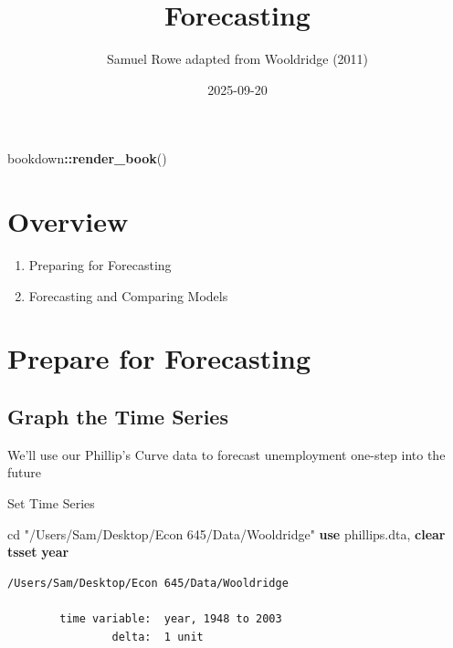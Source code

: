 \documentclass[
]{book}
\title{Forecasting}
\author{Samuel Rowe adapted from Wooldridge (2011)}
\date{2025-09-20}
\newenvironment{Shaded}{\begin{snugshade}}{\end{snugshade}}
\newcommand{\FunctionTok}[1]{\textcolor[rgb]{0.13,0.29,0.53}{\textbf{#1}}}
\newcommand{\KeywordTok}[1]{\textcolor[rgb]{0.13,0.29,0.53}{\textbf{#1}}}
\newcommand{\NormalTok}[1]{#1}
\newcommand{\SpecialCharTok}[1]{\textcolor[rgb]{0.81,0.36,0.00}{\textbf{#1}}}
\newcommand{\StringTok}[1]{\textcolor[rgb]{0.31,0.60,0.02}{#1}}
\providecommand{\tightlist}{%
  \setlength{\itemsep}{0pt}\setlength{\parskip}{0pt}}
\begin{document}
\maketitle

{
\setcounter{tocdepth}{1}
\tableofcontents
}
\begin{Shaded}
\begin{Highlighting}[]
\NormalTok{bookdown}\SpecialCharTok{::}\FunctionTok{render\_book}\NormalTok{()}
\end{Highlighting}
\end{Shaded}

\chapter*{Overview}\label{overview}

\begin{enumerate}
\def\labelenumi{\arabic{enumi}.}
\tightlist
\item
  Preparing for Forecasting
\item
  Forecasting and Comparing Models
\end{enumerate}

\chapter{Prepare for Forecasting}\label{prepare-for-forecasting}

\section{Graph the Time Series}\label{graph-the-time-series}

We'll use our Phillip's Curve data to forecast unemployment one-step into the future

Set Time Series

\begin{Shaded}
\begin{Highlighting}[]
\NormalTok{cd }\StringTok{"/Users/Sam/Desktop/Econ 645/Data/Wooldridge"}
\KeywordTok{use}\NormalTok{ phillips.dta, }\KeywordTok{clear}
\KeywordTok{tsset} \FunctionTok{year}
\end{Highlighting}
\end{Shaded}

\begin{verbatim}
/Users/Sam/Desktop/Econ 645/Data/Wooldridge

        time variable:  year, 1948 to 2003
                delta:  1 unit
\end{verbatim}
\end{document}
